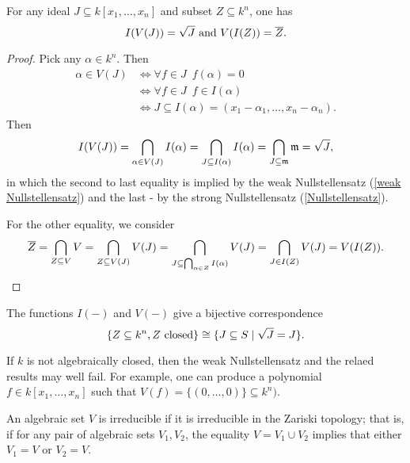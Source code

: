 \begin{theorem}
  \label{algebraic set nullstellensatz}
  For any ideal \(J \subseteq k[x_1, \dotsc, x_n]\) and subset \(Z \subseteq k^n\), one has
  \[I(V(J)) = \sqrt{J} \text{ and } V(I(Z)) = \overline{Z}.\]
\end{theorem}
\begin{proof}
  Pick any \(\alpha \in k^n.\) Then
  \begin{align*}
    \alpha \in V(J) & \iff \forall f \in J \enspace f(\alpha) = 0 \\
                    & \iff \forall f \in J \enspace f \in I(\alpha) \\
                    & \iff J \subseteq I(\alpha) = (x_1 - \alpha_1, \dotsc, x_n - \alpha_n).
  \end{align*}
  Then
  \[I(V(J)) = \bigcap_{\alpha \in V(J)} I(\alpha) = \bigcap_{J \subseteq I(\alpha)} I(\alpha) = \bigcap_{J \subseteq \mathfrak m} \mathfrak m = \sqrt{J},\]
  in which the second to last equality is implied by the weak Nullstellensatz (\cref{weak Nullstellensatz}) and the last - by the strong Nullstellensatz (\cref{Nullstellensatz}).

  For the other equality, we consider
  \[\overline{Z} = \bigcap_{Z \subseteq V} V = \bigcap_{Z \subseteq V(J)} V(J) = \bigcap_{J \subseteq \bigcap_{\alpha \in Z} I(\alpha)} V(J) = \bigcap_{J \in I(Z)} V(J) = V(I(Z)).\]
\end{proof}

\begin{corollary}
  \label{closed in bijection with radical}
  The functions \(I(-)\) and \(V(-)\) give a bijective correspondence
  \[\{Z \subseteq k^n, \text{$Z$ closed}\} \cong \{J \subseteq S \mathrel{|} \sqrt{J} = J\}.\]
\end{corollary}

\begin{note}
  If \(k\) is not algebraically closed, then the weak Nullstellensatz and the relaed results may well fail. For example, one can produce a polynomial \(f \in k[x_1, \dotsc, x_n]\) such that
  \(V(f) = \{(0, \dotsc, 0)\} \subseteq k^n).\)
\end{note}

\begin{df}
  An algebraic set \(V\) is irreducible if it is irreducible in the Zariski topology; that is, if for any pair of algebraic sets \(V_1, V_2\), the equality \(V = V_1 \cup V_2\) implies that either \(V_1 = V\) or \(V_2 = V.\)
\end{df}

